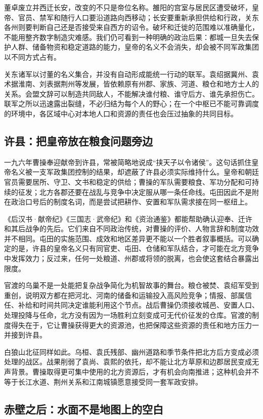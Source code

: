 董卓废立并西迁长安，改变的不只是帝位名称。雒阳的宫室与居民区遭受破坏，皇帝、官员、禁军和随行人口要沿道路向西移动；长安要重新承担供给和行政，关东各州则要判断自己还是否接受来自西方的诏令。破坏和迁徙的范围难以准确量化，不能用整齐数字制造灾难感。我们仍可看到一种明确的政治后果：都城一旦失去保护人群、储备物资和稳定道路的能力，皇帝的名义不会消失，却会被不同军政集团以不同方式占有。

关东诸军以讨董的名义集合，并没有自动形成能统一行动的联军。袁绍据冀州、袁术据淮南、刘表据荆州等发展，皆依赖原有州郡、家族、河道、粮仓和地方士人的关系。会盟文辞可以制造共同敌人，不能解决谁付粮、谁守后方、谁先承担伤亡。联军之所以迅速露出裂缝，不必归结为每个人的野心；在一个中枢已不能可靠调度的环境中，各区域中心对本地人口和资源的责任也会压过抽象的共同目标。

\subsection{许县：把皇帝放在粮食问题旁边}

一九六年曹操奉迎献帝到许县，常被简略地说成“挟天子以令诸侯”。这句话抓住皇帝名义被一支军政集团控制的结果，却遮蔽了许县必须实际维持什么。皇帝和朝廷官员需要居所、守卫、文书和稳定的供给；曹操的军队需要粮食、军功分配和可持续的征发；北方各郡还要在战乱与竞争中决定服从哪一条任命线。屯田因此不是附在政治口号后的制度名词，而是尝试把耕作、安置和军队需求接在同一枢纽上。

《后汉书·献帝纪》《三国志·武帝纪》和《资治通鉴》都能帮助确认迎奉、迁许和其后战争的先后。它们来自不同政治传统，对曹操的评价、人物言辞和制度功效并不相同。屯田的实施范围、成效和地区差异更不能以一个胜者叙事概括。可以确定的是，许县的皇帝名义只有同官吏、屯田、仓储和军队结合，才可能在北方竞争中发挥效力；反过来，任何一处粮道、州郡或将领的脱离，也会使这套结合暴露出限度。

官渡的乌巢不是一处能把复杂战争简化为机智故事的舞台。粮仓被焚、袁绍军受到重创，说明双方都在把河北、河南的储备和运输投入高风险竞争；情报、部属信任、补给和时间共同决定谁能利用这个节点。战后曹操仍须接收城邑、安置人口、处理投降与任命，北方没有因为一场胜利立刻变成可无代价征发的仓库。官渡的制度得失在于，它让曹操获得更大的资源池，也把保障这些资源的责任和地方压力一并接到许县。

白狼山北征同样如此。乌桓、袁氏残部、幽州道路和季节条件把北方后方变成必须处理的战区。战果削弱了袁尚、袁熙的依托，却不能让北方草原和边郡居民变成无声背景。曹操取得更可集中使用的北方资源后，才有机会向南推进；这种机会并不等于长江水道、荆州关系和江南城镇愿意接受同一套军政安排。

\subsection{赤壁之后：水面不是地图上的空白}

